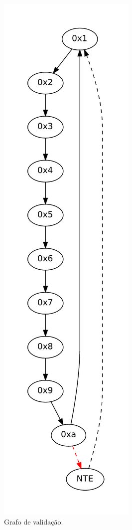 \documentclass[11pt,twoside]{article}
\begin{document}
\begin{figure}[!ht]
\includegraphics[scale=0.35]{./figs/validacao}
\caption{Grafo de validação.}
\label{fig-validacao}
\end{figure}
\end{document}
